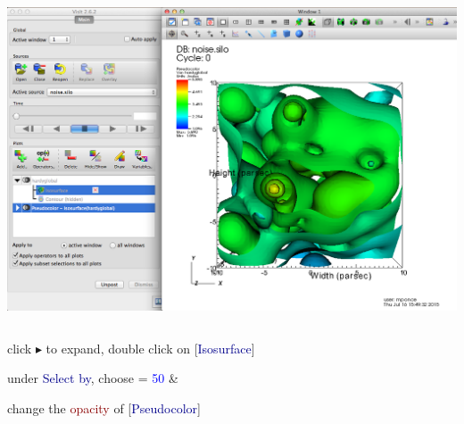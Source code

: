 \begin{frame}
\begin{columns}
\begin{column}{6cm}
        \centering
        \includegraphics[width=\columnwidth]{figs/visit-pract/VisIt_pseudocolor-isosurf}
\end{column}
\end{columns}

\pause
\vspace{2mm}
\textcolor{DarkBlue}{}
        click $\blacktriangleright$ to expand, double click on [\textcolor{DarkBlue}{Isosurface}]

\hspace{4mm}
\textcolor{DarkBlue}{}
under \textcolor{DarkBlue}{Select by}, choose \framebox{\textcolor{DarkGreen}{Percent (s)}} = \textcolor{blue}{50} \Enter \& 


\pause
\vspace{2mm}
\textcolor{DarkBlue}{}
        change the \textcolor{DarkRed}{opacity} of [\textcolor{DarkBlue}{Pseudocolor}]
\end{frame}


